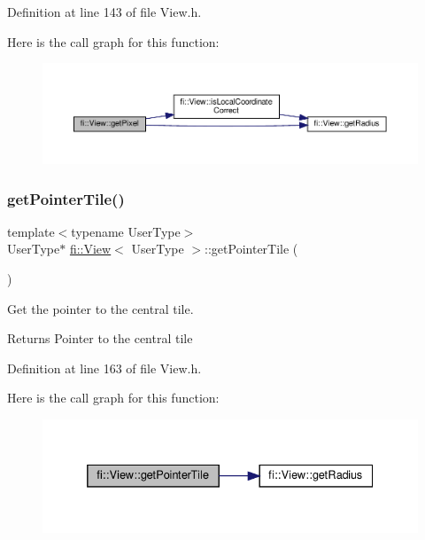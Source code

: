 Definition at line 143 of file View.\+h.

Here is the call graph for this function\+:
\nopagebreak
\begin{figure}[H]
\begin{center}
\leavevmode
\includegraphics[width=350pt]{d5/dd4/classfi_1_1View_a5b05f97a8d0a58a8126911a0467f4544_cgraph}
\end{center}
\end{figure}
\mbox{\label{classfi_1_1View_af386d23db727519b0016bb885061e5f4}} 
\subsubsection{\texorpdfstring{get\+Pointer\+Tile()}{getPointerTile()}}
{\footnotesize\ttfamily template$<$typename User\+Type$>$ \\
User\+Type$\ast$ \hyperlink{classfi_1_1View}{fi\+::\+View}$<$ User\+Type $>$\+::get\+Pointer\+Tile (\begin{DoxyParamCaption}{ }\end{DoxyParamCaption})\hspace{0.3cm}{\ttfamily [inline]}}



Get the pointer to the central tile. 

\begin{DoxyReturn}{Returns}
Pointer to the central tile 
\end{DoxyReturn}


Definition at line 163 of file View.\+h.

Here is the call graph for this function\+:
\nopagebreak
\begin{figure}[H]
\begin{center}
\leavevmode
\includegraphics[width=332pt]{d5/dd4/classfi_1_1View_af386d23db727519b0016bb885061e5f4_cgraph}
\end{center}
\end{figure}
\mbox{\label{classfi_1_1View_a0e586b5f01729eb97c6358b02426c50b}} 

